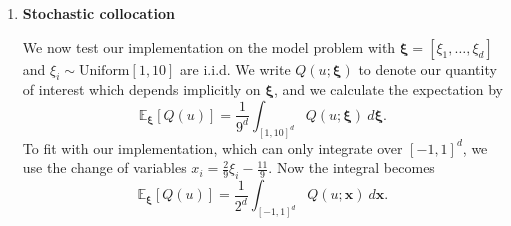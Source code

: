 \documentclass[12pt]{article}
\begin{document}
\begin{enumerate}
\item {\large \textbf{Stochastic collocation}}

\hspace{0.5cm}  We now test our implementation on the model problem with ${\bm \xi} = [\xi_1,\ldots, \xi_d]$ and $\xi_i \sim \text{Uniform}[1,10]$ are i.i.d.  We write $Q(u; {\bm \xi})$ to denote our quantity of interest which depends implicitly on ${\bm \xi}$, and we calculate the expectation by
\begin{equation}
\label{eq:expectation}
\mathbb{E}_{\bm \xi}[Q(u)] = \frac{1}{9^d} \int_{[1,10]^d} Q(u; {\bm \xi})\ d{\bm \xi}.
\end{equation}
To fit with our implementation, which can only integrate over $[-1,1]^d$, we use the change of variables $x_i = \frac{2}{9}\xi_i - \frac{11}{9}$.  Now the integral becomes
\begin{equation}
\label{eq:change_of_variables}
\mathbb{E}_{\bm \xi}[Q(u)] = \frac{1}{2^d} \int_{[-1,1]^d} Q(u; {\bm x})\ d{\bm x}.
\end{equation}

\end{enumerate}
\end{document}
